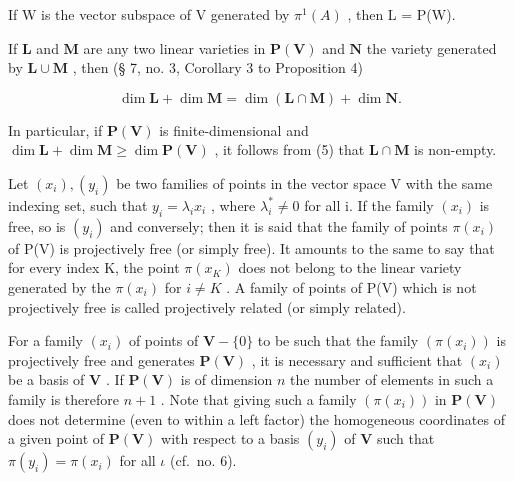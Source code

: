 If W is the vector subspace of V generated by \(\pi^{1}(A)\) , then L = P(W).

If \(\mathbf{L}\) and \(\mathbf{M}\) are any two linear varieties in \(\mathbf{P}(\mathbf{V})\) and \(\mathbf{N}\) the variety generated by \(\mathbf{L} \cup \mathbf{M}\) , then (§ 7, no. 3, Corollary 3 to Proposition 4)

\[
\dim \mathbf {L} + \dim \mathbf {M} = \dim (\mathbf {L} \cap \mathbf {M}) + \dim \mathbf {N}.\tag{5}
\]

In particular, if \(\mathbf{P}(\mathbf{V})\) is finite-dimensional and \(\dim \mathbf{L} + \dim \mathbf{M} \geqslant \dim \mathbf{P}(\mathbf{V})\) , it follows from (5) that \(\mathbf{L} \cap \mathbf{M}\) is non-empty.

Let \((x_{i}), (y_{i})\) be two families of points in the vector space V with the same indexing set, such that \(y_{i} = \lambda_{i}x_{i}\) , where \(\lambda_{i}^{*} \neq 0\) for all i. If the family \((x_{i})\) is free, so is \((y_{i})\) and conversely; then it is said that the family of points \(\pi(x_{i})\) of P(V) is projectively free (or simply free). It amounts to the same to say that for every index K, the point \(\pi(x_{K})\) does not belong to the linear variety generated by the \(\pi(x_{i})\) for \(i \neq K\) . A family of points of P(V) which is not projectively free is called projectively related (or simply related).

For a family \((x_{i})\) of points of \(\mathbf{V} - \{0\}\) to be such that the family \((\pi (x_{i}))\) is projectively free and generates \(\mathbf{P}(\mathbf{V})\) , it is necessary and sufficient that \((x_{i})\) be a basis of \(\mathbf{V}\) . If \(\mathbf{P}(\mathbf{V})\) is of dimension \(n\) the number of elements in such a family is therefore \(n + 1\) . Note that giving such a family \((\pi (x_{i}))\) in \(\mathbf{P}(\mathbf{V})\) does not determine (even to within a left factor) the homogeneous coordinates of a given point of \(\mathbf{P}(\mathbf{V})\) with respect to a basis \((y_{i})\) of \(\mathbf{V}\) such that \(\pi (y_{i}) = \pi (x_{i})\) for all \(\iota\) (cf.~no. 6).

